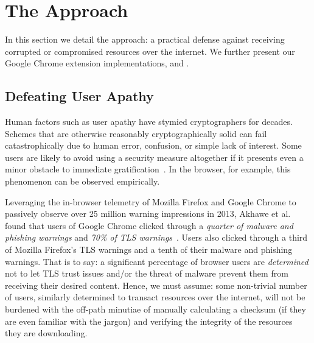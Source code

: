 \section{The \SYSTEM{} Approach} \label{sec:approach}

In this section we detail the \SYSTEM{} approach: a practical defense against
receiving corrupted or compromised resources over the internet. We further
present our Google Chrome extension implementations, \DNSSYS{}
and \DHTSYS{}.

\subsection{Defeating User Apathy}

Human factors such as user apathy have stymied cryptographers for decades.
Schemes that are otherwise reasonably cryptographically solid can fail
catastrophically due to human error, confusion, or simple lack of interest. Some
users are likely to avoid using a security measure altogether if it presents
even a minor obstacle to immediate gratification~\cite{Clickthrough, PGPBad}. In
the browser, for example, this phenomenon can be observed empirically.


Leveraging the in-browser telemetry of Mozilla Firefox and Google Chrome to
passively observe over 25 million warning impressions in 2013, Akhawe et al.
found that users of Google Chrome clicked through a \emph{quarter of malware and
phishing warnings} and \emph{70\% of TLS warnings}~\cite{Clickthrough}. Users
also clicked through a third of Mozilla Firefox's TLS warnings and a tenth of
their malware and phishing warnings. That is to say: a significant percentage of
browser users are \emph{determined} not to let TLS trust issues and/or the
threat of malware prevent them from receiving their desired content. Hence, we
must assume: some non-trivial number of users, similarly determined to transact
resources over the internet, will not be burdened with the off-path minutiae of
manually calculating a checksum (if they are even familiar with the jargon) and
verifying the integrity of the resources they are downloading.

